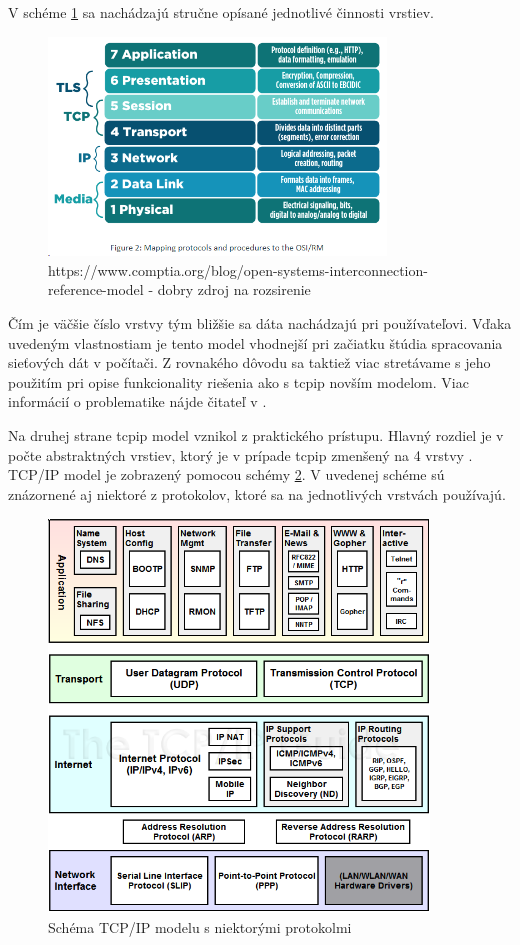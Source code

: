 V schéme \ref{osi} sa nachádzajú stručne opísané jednotlivé činnosti vrstiev.
\begin{figure}[!h]
	\centering
	\includegraphics[width=0.8\textwidth]{figures/osi}
	\caption{https://www.comptia.org/blog/open-systems-interconnection-reference-model - dobry zdroj na rozsirenie}
	\label{osi}
\end{figure}


Čím je väčšie číslo vrstvy tým bližšie sa dáta nachádzajú pri používateľovi. Vďaka uvedeným vlastnostiam je tento model vhodnejší pri začiatku štúdia spracovania sieťových dát v počítači. Z rovnakého dôvodu sa taktiež viac stretávame s jeho použitím pri opise funkcionality riešenia ako s  \acrshort{tcpip} novším modelom.  Viac informácií o problematike nájde čitateľ v \cite{osi}.

Na druhej strane \acrshort{tcpip} model vznikol z praktického prístupu. Hlavný rozdiel je v počte abstraktných vrstiev, ktorý je v prípade \acrshort{tcpip} zmenšený na 4 vrstvy \cite{tcpip}. 
TCP/IP model je zobrazený pomocou schémy \ref{tcpipprot}. V uvedenej schéme sú znázornené aj niektoré z protokolov, ktoré sa na jednotlivých vrstvách používajú.

\begin{figure}[!ht]
	\centering
	\includegraphics[width=0.9\textwidth]{figures/tcpipprot}
	\caption{Schéma TCP/IP modelu s niektorými protokolmi}
	\label{tcpipprot}
\end{figure}

